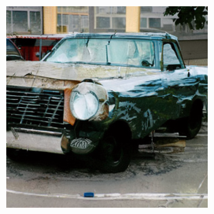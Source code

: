 \documentclass{article}
\begin{document}
\begin{figure}
\begin{subfigure}[b]{0.19\linewidth}
    \end{subfigure}
    \begin{subfigure}[b]{0.19\linewidth}
    \includegraphics[width=\linewidth]{figures/imagenet256/solver_samples/imagenet256_fm_ot_05_50.png}
    \end{subfigure}\\
    

\end{figure}
\end{document}
